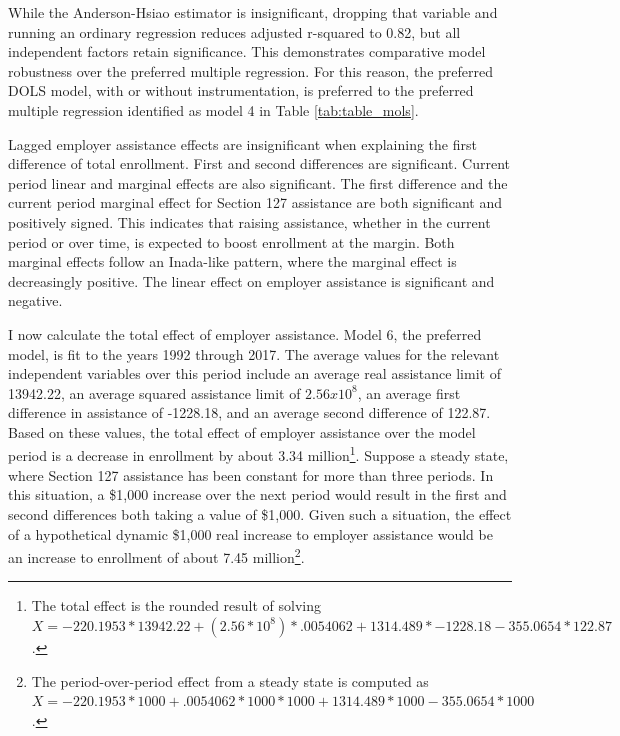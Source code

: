 \documentclass[review]{elsarticle}
\begin{document}
    While the Anderson-Hsiao estimator is insignificant,
    dropping that variable and running an ordinary regression reduces adjusted r-squared to 0.82,
    but all independent factors retain significance.
    This demonstrates comparative model robustness over the preferred multiple regression.
    For this reason, the preferred DOLS model, with or without instrumentation,
    is preferred to the preferred multiple regression identified as
    model 4 in Table \ref{tab:table_mols}.

    Lagged employer assistance effects are insignificant when explaining the first difference of total enrollment.
    First and second differences are significant.
    Current period linear and marginal effects are also significant.
    The first difference and the current period marginal effect for
    Section 127 assistance are both significant and positively signed.
    This indicates that raising assistance,
    whether in the current period or over time,
    is expected to boost enrollment at the margin.
    Both marginal effects follow an Inada-like pattern, where the marginal effect is decreasingly positive.
    The linear effect on employer assistance is significant and negative.

    I now calculate the total effect of employer assistance.
    Model 6, the preferred model, is fit to the years 1992 through 2017.
    The average values for the relevant independent variables over this period include
    an average real assistance limit of 13942.22,
    an average squared assistance limit of $2.56x10^8$,
    an average first difference in assistance of -1228.18,
    and an average second difference of 122.87.
    Based on these values, the total effect of employer assistance over the model period is
    a decrease in enrollment by about 3.34 million\footnote{
        The total effect is the rounded result of solving $X=-220.1953*13942.22+(2.56*10^8)*.0054062+1314.489*-1228.18-355.0654*122.87$.
    }.
    Suppose a steady state, where Section 127 assistance has been constant for more than three periods.
    In this situation, a \$1,000 increase over the next period would result in
    the first and second differences both taking a value of \$1,000.
    Given such a situation,
    the effect of a hypothetical dynamic \$1,000 real increase to employer assistance would be
    an increase to enrollment of about 7.45 million\footnote{
        The period-over-period effect from a steady state is computed as $X=-220.1953*1000+.0054062*1000*1000+1314.489*1000-355.0654*1000$.
    }.
\end{document}
